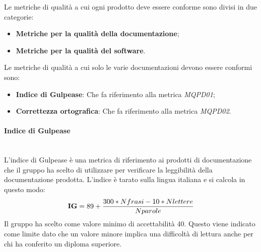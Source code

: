 \newpage
{}
Le metriche di qualità a cui ogni prodotto deve essere conforme sono divisi in due categorie:
\begin{itemize}
	\item \textbf{Metriche per la qualità della documentazione};
	\item \textbf{Metriche per la qualità del software}.
\end{itemize}
Le metriche di qualità a cui solo le varie documentazioni devono essere conformi sono:
\begin{itemize}
	\item \textbf{Indice di Gulpease}: Che fa riferimento alla metrica \textit{MQPD01};
	\item \textbf{Correttezza ortografica}: Che fa riferimento alla metrica \textit{MQPD02}.
\end{itemize}
\paragraph{Indice di Gulpease}\mbox{}\\
L'indice di Gulpease è una metrica di riferimento ai prodotti di documentazione che il gruppo ha scelto di utilizzare per verificare la leggibilità della documentazione prodotta. L'indice è tarato sulla lingua italiana e si calcola in questo modo:
\begin{align*}
	\centering
	\textbf{IG} = 89 + \frac{300 * Nfrasi - 10 * Nlettere}{Nparole}
\end{align*}
Il gruppo ha scelto come valore minimo di accettabilità 40. Questo viene indicato come limite dato che un valore minore implica una difficoltà di lettura anche per chi ha conferito un diploma superiore.
